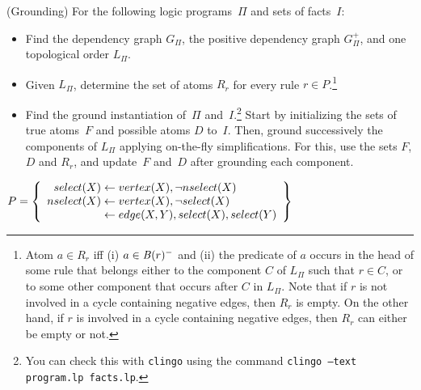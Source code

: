 \begin{Uebung}{(Grounding)}
For the following logic programs~$\Pi$ and sets of facts~$I$:
\begin{itemize}
\item Find the dependency graph $G_{\Pi}$,
      the positive dependency graph $G_{\Pi}^+$,
      and one topological order $L_{\Pi}$.
\item %
      Given $L_{\Pi}$,
      determine the set of atoms $R_r$ for every rule $r \in P$.\footnote{%
      Atom $a \in R_r$ iff (i) $a \in \mathit{B}(r)^-$ and (ii)
      the predicate of $a$ occurs in the head of some rule
      that belongs either to the component $C$ of $L_{\Pi}$ such that $r \in C$, or
      to some other component that occurs after $C$ in $L_{\Pi}$.
      Note that if $r$ is not involved in a cycle containing negative edges, then $R_r$ is empty.
      On the other hand, if $r$ is involved in a cycle containing negative edges, then $R_r$ can either be empty or not.}
\item Find the ground instantiation of~$\Pi$ and~$I$.\footnote{%
      You can check this with \texttt{clingo} 
      using the command \texttt{clingo --text program.lp facts.lp}.}
      Start by initializing the sets of true atoms~$F$ and possible atoms $D$ to~$I$.
      Then, ground successively the components of $L_{\Pi}$ applying on-the-fly simplifications.
      For this, use the sets $F$, $D$ and $R_r$,
      and update~$F$ and~$D$ after grounding each component.
\end{itemize}

%
\begin{UList}
\item
\(
  \Pi 
  = 
  \left\{
  \begin{array}{r@{}c@{}l}
    select(X) & {} \leftarrow {} & vertex(X),\naf{nselect(X)} \\
    nselect(X) & {} \leftarrow {} & vertex(X),\naf{select(X)} \\
      & {} \leftarrow {} & edge(X,Y), select(X), select(Y)
  \end{array}
  \right\}
\)


\end{UList}
\end{Uebung}
